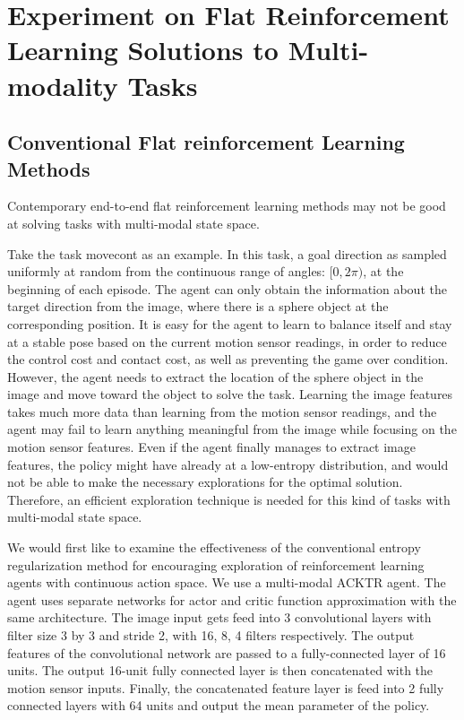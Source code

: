 
\section{Experiment on Flat Reinforcement Learning Solutions to Multi-modality Tasks}
\subsection{Conventional Flat reinforcement Learning Methods}\label{sec_multi_modal_flat}
Contemporary end-to-end flat reinforcement learning methods may not be good at solving tasks with multi-modal state space. 

Take the task movecont as an example. In this task, a goal direction as sampled uniformly at random from the continuous range of angles: $[0,2\pi)$, at the beginning of each episode. The agent can only obtain the information about the target direction from the image, where there is a sphere object at the corresponding position. It is easy for the agent to learn to balance itself and stay at a stable pose based on the current motion sensor readings, in order to reduce the control cost and contact cost, as well as preventing the game over condition. However, the agent needs to extract the location of the sphere object in the image and move toward the object to solve the task. Learning the image features takes much more data than learning from the motion sensor readings, and the agent may fail to learn anything meaningful from the image while focusing on the motion sensor features. Even if the agent finally manages to extract image features, the policy might have already at a low-entropy distribution, and would not be able to make the necessary explorations for the optimal solution. Therefore, an efficient exploration technique is needed for this kind of tasks with multi-modal state space.

We would first like to examine the effectiveness of the conventional entropy regularization method for encouraging exploration of reinforcement learning agents with continuous action space. We use a multi-modal ACKTR agent. The agent uses separate networks for actor and critic function approximation with the same architecture. The image input gets feed into 3 convolutional layers with filter size 3 by 3 and stride 2, with 16, 8, 4 filters respectively. The output features of the convolutional network are passed to a fully-connected layer of 16 units. The output 16-unit fully connected layer is then concatenated with the motion sensor inputs. Finally, the concatenated feature layer is feed into 2 fully connected layers with 64 units and output the mean parameter of the policy. 

